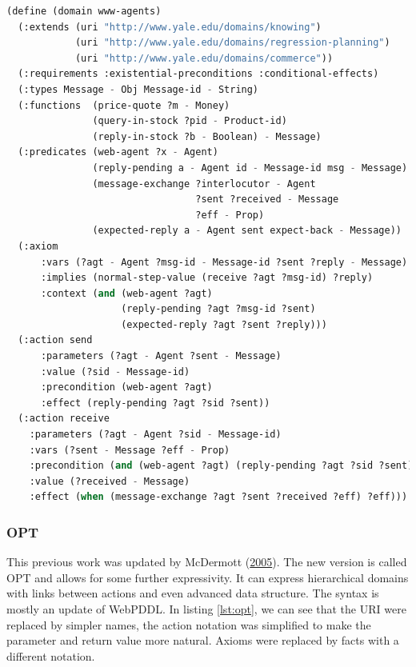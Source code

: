\documentclass[11pt,a4paper,twoside,openright,titlepage,numbers=noenddot,headinclude,cleardoublepage=empty,openany]{scrreprt}
\theoremstyle{plain}
\theoremstyle{definition}
\theoremstyle{remark}
\begin{document}
\begin{lstlisting}[language=Lisp, caption={Example of WebPDDL syntax by Mc Dermott.}, escapechar={$}, label=lst:webpddl]
(define (domain www-agents)
  (:extends (uri "http://www.yale.edu/domains/knowing")
            (uri "http://www.yale.edu/domains/regression-planning")
            (uri "http://www.yale.edu/domains/commerce"))
  (:requirements :existential-preconditions :conditional-effects)
  (:types Message - Obj Message-id - String)
  (:functions  (price-quote ?m - Money)
               (query-in-stock ?pid - Product-id)
               (reply-in-stock ?b - Boolean) - Message)
  (:predicates (web-agent ?x - Agent)
               (reply-pending a - Agent id - Message-id msg - Message)
               (message-exchange ?interlocutor - Agent
                                 ?sent ?received - Message
                                 ?eff - Prop)
               (expected-reply a - Agent sent expect-back - Message))
  (:axiom
      :vars (?agt - Agent ?msg-id - Message-id ?sent ?reply - Message)
      :implies (normal-step-value (receive ?agt ?msg-id) ?reply)
      :context (and (web-agent ?agt)
                    (reply-pending ?agt ?msg-id ?sent)
                    (expected-reply ?agt ?sent ?reply)))
  (:action send
      :parameters (?agt - Agent ?sent - Message)
      :value (?sid - Message-id)
      :precondition (web-agent ?agt)
      :effect (reply-pending ?agt ?sid ?sent))
  (:action receive
    :parameters (?agt - Agent ?sid - Message-id)
    :vars (?sent - Message ?eff - Prop)
    :precondition (and (web-agent ?agt) (reply-pending ?agt ?sid ?sent))
    :value (?received - Message)
    :effect (when (message-exchange ?agt ?sent ?received ?eff) ?eff)))
\end{lstlisting}

\hypertarget{opt}{%
\subsubsection{OPT}\label{opt}}

This previous work was updated by McDermott
(\protect\hyperlink{ref-mcdermott_opt_2005}{2005}). The new version is
called OPT and allows for some further expressivity. It can express
hierarchical domains with links between actions and even advanced data
structure. The syntax is mostly an update of WebPDDL. In
listing \ref{lst:opt}, we can see that the URI were replaced by simpler
names, the action notation was simplified to make the parameter and
return value more natural. Axioms were replaced by facts with a
different notation.
\end{document}
